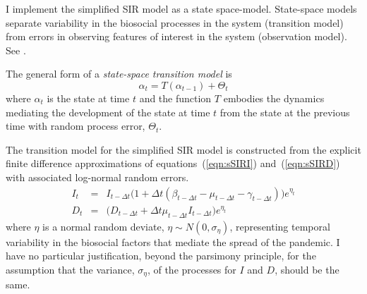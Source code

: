 \documentclass[12pt,letterpaper]{article}
\begin{document}
I implement the simplified SIR model as a state space-model.
State-space models separate variability in the biosocial
processes in the system (transition model)
from errors in observing features of interest
in the system (observation model).
See \cite{Harvey1990}.

The general form of a {\itshape state-space transition model} is
\begin{equation}
\alpha_t=T(\alpha_{t-1}) + \Theta_t
\end{equation}
where $\alpha_t$ is the state at time $t$ and 
the function $T$ embodies the dynamics mediating the
development of the state at time $t$ from the state at the previous
time with random process error, $\Theta_t$.

The transition model for the simplified SIR model is constructed from
the explicit finite difference
approximations of equations~(\ref{eqn:sSIRI}) and~(\ref{eqn:sSIRD}) 
with associated log-normal
random errors.
\begin{eqnarray}
\label{eqn:sSIRfdI}
I_t &=& I_{t-\Delta t}\big(1+\Delta t(\beta_{t-\Delta t} - \mu_{t-\Delta t}
- \gamma_{t-\Delta t})\big)e^{\eta_t}\\
\label{eqn:sSIRfdD}
D_t &=& \big(D_{t-\Delta t} + \Delta t \mu_{t-\Delta t}I_{t-\Delta
t}\big)e^{\eta_t}
\end{eqnarray}
where $\eta$ is a normal random deviate, $\eta\sim
N(0,\sigma_\eta)$, representing temporal variability in the biosocial
factors that mediate the spread of the pandemic. 
I have no particular justification, beyond the parsimony principle,
for the assumption that the variance, $\sigma_\eta$, of the processes
for $I$ and $D$, should be the same.
\end{document}
